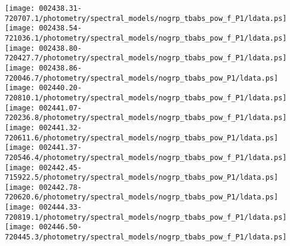\documentclass{aastex}
\begin{document}
\begin{figure*}[!ht]
\centering
\texttt{[image: 002438.31-720707.1/photometry/spectral\_models/nogrp\_tbabs\_pow\_f\_P1/ldata.ps]} \hfill 
\texttt{[image: 002438.54-721036.1/photometry/spectral\_models/nogrp\_tbabs\_pow\_f\_P1/ldata.ps]} \hfill 
\texttt{[image: 002438.80-720427.7/photometry/spectral\_models/nogrp\_tbabs\_pow\_f\_P1/ldata.ps]} \\ 
\vspace*{0.5in}
\texttt{[image: 002438.86-720046.7/photometry/spectral\_models/nogrp\_tbabs\_pow\_P1/ldata.ps]} \hfill 
\texttt{[image: 002440.20-720810.1/photometry/spectral\_models/nogrp\_tbabs\_pow\_f\_P1/ldata.ps]} \hfill 
\texttt{[image: 002441.07-720236.8/photometry/spectral\_models/nogrp\_tbabs\_pow\_f\_P1/ldata.ps]} \\ 
\vspace*{0.5in}
\texttt{[image: 002441.32-720611.6/photometry/spectral\_models/nogrp\_tbabs\_pow\_P1/ldata.ps]} \hfill 
\texttt{[image: 002441.37-720546.4/photometry/spectral\_models/nogrp\_tbabs\_pow\_f\_P1/ldata.ps]} \hfill 
\texttt{[image: 002442.45-715922.5/photometry/spectral\_models/nogrp\_tbabs\_pow\_P1/ldata.ps]} \\ 
\vspace*{0.5in}
\texttt{[image: 002442.78-720620.6/photometry/spectral\_models/nogrp\_tbabs\_pow\_P1/ldata.ps]} \hfill 
\texttt{[image: 002444.33-720819.1/photometry/spectral\_models/nogrp\_tbabs\_pow\_f\_P1/ldata.ps]} \hfill 
\texttt{[image: 002446.50-720445.3/photometry/spectral\_models/nogrp\_tbabs\_pow\_f\_P1/ldata.ps]} \\ 
\vspace*{0.5in}
\end{figure*}
\clearpage
\end{document}
